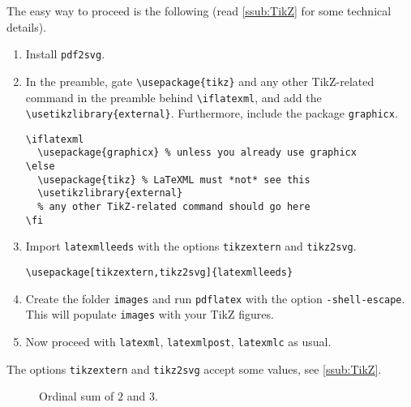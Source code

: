 \documentclass[a4paper]{article}
\def\ltxinline{\lstinline[style=latexml]}
\theoremstyle{definition}
\begin{document}
The easy way to proceed is the following (read \autoref{ssub:TikZ} for some technical details).
\begin{enumerate}
  \item Install \verb|pdf2svg|.
  \item In the preamble, gate \ltxinline|\usepackage{tikz}| and any other TikZ-related command in the preamble behind \ltxinline|\iflatexml|, and add the \ltxinline|\usetikzlibrary{external}|. Furthermore, include the package \verb|graphicx|.
      \begin{lstlisting}[style=latexml]
\iflatexml
  \usepackage{graphicx} % unless you already use graphicx
\else
  \usepackage{tikz} % LaTeXML must *not* see this
  \usetikzlibrary{external}
  % any other TikZ-related command should go here
\fi
      \end{lstlisting}
  \item  Import \ltxinline|latexmlleeds| with the options \ltxinline|tikzextern| and \ltxinline|tikz2svg|.
  \begin{lstlisting}[style=latexml]
\usepackage[tikzextern,tikz2svg]{latexmlleeds}
  \end{lstlisting}
  \item Create the folder \verb|images| and run \verb|pdflatex| with the option \verb|-shell-escape|. This will populate \verb|images| with your TikZ figures.
  \item Now proceed with \verb|latexml|, \verb|latexmlpost|, \verb|latexmlc| as usual.
\end{enumerate}

The options \verb|tikzextern| and \verb|tikz2svg| accept some values, see \autoref{ssub:TikZ}.

\begin{figure}
  \begin{center}
  \end{center}
  \caption{Ordinal sum of $2$ and $3$.}
  \label{fig:tikz-example}
\end{figure}
\end{document}
